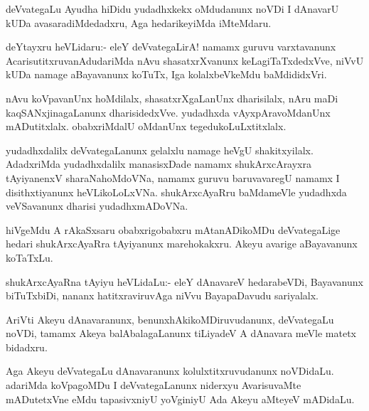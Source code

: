 \documentclass{article}
\begin{document}
\begin{mn}
deVvategaLu Ayudha hiDidu yudadhxkekx oMdudanunx noVDi I dAnavarU kUDa
avasaradiMdedadxru, Aga hedarikeyiMda iMteMdaru.
\end{mn}

\begin{mn}%
deYtayxru heVLidaru:- eleY deVvategaLirA! namamx guruvu varxtavanunx
AcarisutitxruvanAdudariMda nAvu shasatxrXvanunx keLagiTaTxdedxVve,
niVvU kUDa namage aBayavanunx koTuTx, Iga kolalxbeVkeMdu baMdididxVri.
\end{mn}

\begin{mn}
nAvu koVpavanUnx hoMdilalx, shasatxrXgaLanUnx dharisilalx, nAru maDi
kaqSANxjinagaLanunx dharisidedxVve. yudadhxda vAyxpAravoMdanUnx
mADutitxlalx. obabxriMdalU oMdanUnx tegedukoLuLxtitxlalx.
\end{mn}

\begin{mn}%
yudadhxdalilx deVvategaLanunx gelalxlu namage heVgU
shakitxyilalx. AdadxriMda yudadhxdalilx manasisxDade namamx
shukArxcArayxra tAyiyanenxV sharaNahoMdoVNa, namamx guruvu
baruvavaregU namamx I disithxtiyanunx heVLikoLoLxVNa. shukArxcAyaRru
baMdameVle yudadhxda veVSavanunx dharisi yudadhxmADoVNa.
\end{mn}

\begin{mn}
hiVgeMdu A rAkaSxsaru obabxrigobabxru mAtanADikoMDu deVvategaLige
hedari shukArxcAyaRra tAyiyanunx marehokakxru. Akeyu avarige
aBayavanunx koTaTxLu.
\end{mn}

\begin{mn}%
shukArxcAyaRna tAyiyu heVLidaLu:- eleY dAnavareV hedarabeVDi,
Bayavanunx biTuTxbiDi, nananx hatitxraviruvAga niVvu BayapaDavudu sariyalalx.
\end{mn}

\begin{mn}
AriVti Akeyu dAnavaranunx, benunxhAkikoMDiruvudanunx, deVvategaLu
noVDi, tamamx Akeya balAbalagaLanunx tiLiyadeV A dAnavara meVle matetx bidadxru.
\end{mn}

\begin{mn}%
Aga Akeyu deVvategaLu dAnavaranunx kolulxtitxruvudanunx
noVDidaLu. adariMda koVpagoMDu I deVvategaLanunx niderxyu AvarisuvaMte
mADutetxVne eMdu tapasivxniyU yoVginiyU Ada Akeyu aMteyeV mADidaLu.
\end{mn}
\end{document}
